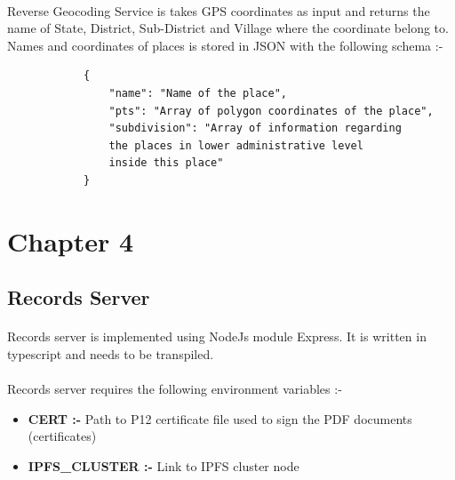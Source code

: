\documentclass{article}
\begin{document}
        \paragraph{}
        Reverse Geocoding Service is takes GPS coordinates as input and returns the name of State, District, Sub-District and Village where the coordinate belong to. Names and coordinates of places is stored in JSON with the following schema :-

        \begin{listing}[H]
        \begin{verbatim}
            {     
                "name": "Name of the place",
                "pts": "Array of polygon coordinates of the place",
                "subdivision": "Array of information regarding
                the places in lower administrative level
                inside this place"
            }
        \end{verbatim}
        \end{listing}
        
        


\section{Chapter 4}
    \subsection{Records Server}
        \paragraph{}
        Records server is implemented using NodeJs module Express. It is written in typescript and needs to be transpiled.
        
        \paragraph{}
        Records server requires the following environment variables :-
        \begin{itemize}
            \item \textbf{CERT :-} Path to P12 certificate file used to sign the PDF documents (certificates)
            \item \textbf{IPFS\_CLUSTER :-} Link to IPFS cluster node
        \end{itemize}
        
\end{document}
